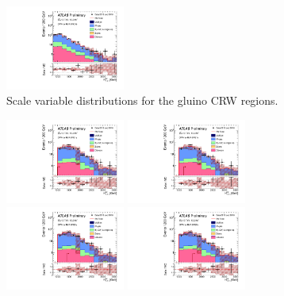 \begin{figure}[tbph]
\begin{center}
\includegraphics[width=0.35\textwidth]{figures/ATLAS-CONF-2016-078_INT/N-1Plots/AtlasStyle/Preliminary/CRW_SRJigsawSRG3b_LastCut_CRW_minusone}
\end{center}
\caption{Scale variable distributions for the gluino CRW regions.}
\label{fig:CRW_SRJigsawSRG2b_LastCut_CRW_minusone}
\end{figure}

\begin{figure}[tbph]
\begin{center}
\includegraphics[width=0.35\textwidth]{figures/ATLAS-CONF-2016-078_INT/N-1Plots/AtlasStyle/Preliminary/CRW_SRJigsawSRS1a_LastCut_CRW_minusone}
\includegraphics[width=0.35\textwidth]{figures/ATLAS-CONF-2016-078_INT/N-1Plots/AtlasStyle/Preliminary/CRW_SRJigsawSRS1b_LastCut_CRW_minusone}
\includegraphics[width=0.35\textwidth]{figures/ATLAS-CONF-2016-078_INT/N-1Plots/AtlasStyle/Preliminary/CRW_SRJigsawSRS2a_LastCut_CRW_minusone}
\includegraphics[width=0.35\textwidth]{figures/ATLAS-CONF-2016-078_INT/N-1Plots/AtlasStyle/Preliminary/CRW_SRJigsawSRS2b_LastCut_CRW_minusone}

\end{center}
\end{figure}
